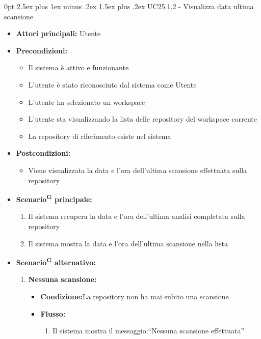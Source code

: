 \documentclass[a4paper, 11pt]{article}
\makeatletter
\renewcommand\paragraph{\@startsection{paragraph}{4}
  {0pt}
  {2.5ex plus 1ex minus .2ex}
  {1.5ex plus .2ex}
  {\normalfont\normalsize\bfseries\color{AccentDark}}}
\makeatother
\begin{document}
\paragraph{UC25.1.2 - Visualizza data ultima scansione} \label{UC25.1.2}
\begin{itemize}
	\item \textbf{Attori principali:} Utente
	\item \textbf{Precondizioni:}
	\begin{itemize}
		\item Il sistema è attivo e funzionante
		\item L'utente è stato riconosciuto dal sistema come Utente
		\item L'utente ha selezionato un workspace
		\item L'utente sta visualizzando la lista delle repository del workspace corrente
		\item La repository di riferimento esiste nel sistema
	\end{itemize}
	\item \textbf{Postcondizioni:}
	\begin{itemize}
		\item Viene visualizzata la data e l'ora dell'ultima scansione effettuata sulla repository
	\end{itemize}
	\item \textbf{Scenario\textsuperscript{G} principale:}
	\begin{enumerate}
		\item Il sistema recupera la data e l'ora dell'ultima analisi completata sulla repository
		\item Il sistema mostra la data e l'ora dell'ultima scansione nella lista
	\end{enumerate}
	\item \textbf{Scenario\textsuperscript{G} alternativo:}
	\begin{enumerate}
		\item \textbf{Nessuna scansione:}
			\begin{itemize}
				\item \textbf{Condizione:}La repository non ha mai subito una scansione
				\item \textbf{Flusso:}
				\begin{enumerate}
					\item Il sistema mostra il messaggio:“Nessuna scansione effettuata”
				\end{enumerate}
			\end{itemize}
	\end{enumerate}
\end{itemize}
\end{document}
